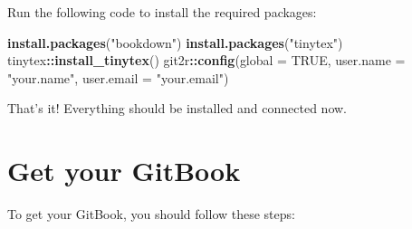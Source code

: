\documentclass[
]{book}
\newenvironment{Shaded}{\begin{snugshade}}{\end{snugshade}}
\newcommand{\AttributeTok}[1]{\textcolor[rgb]{0.13,0.29,0.53}{#1}}
\newcommand{\ConstantTok}[1]{\textcolor[rgb]{0.56,0.35,0.01}{#1}}
\newcommand{\FunctionTok}[1]{\textcolor[rgb]{0.13,0.29,0.53}{\textbf{#1}}}
\newcommand{\NormalTok}[1]{#1}
\newcommand{\SpecialCharTok}[1]{\textcolor[rgb]{0.81,0.36,0.00}{\textbf{#1}}}
\newcommand{\StringTok}[1]{\textcolor[rgb]{0.31,0.60,0.02}{#1}}
\begin{document}
Run the following code to install the required packages:

\begin{Shaded}
\begin{Highlighting}[]
\FunctionTok{install.packages}\NormalTok{(}\StringTok{"bookdown"}\NormalTok{)}
\FunctionTok{install.packages}\NormalTok{(}\StringTok{"tinytex"}\NormalTok{)}
\NormalTok{tinytex}\SpecialCharTok{::}\FunctionTok{install\_tinytex}\NormalTok{()}
\NormalTok{git2r}\SpecialCharTok{::}\FunctionTok{config}\NormalTok{(}\AttributeTok{global =} \ConstantTok{TRUE}\NormalTok{, }\AttributeTok{user.name =} \StringTok{"your.name"}\NormalTok{, }\AttributeTok{user.email =} \StringTok{"your.email"}\NormalTok{)}
\end{Highlighting}
\end{Shaded}

That's it! Everything should be installed and connected now.

\chapter{Get your GitBook}\label{getgitbook}

To get your GitBook, you should follow these steps:
\end{document}
